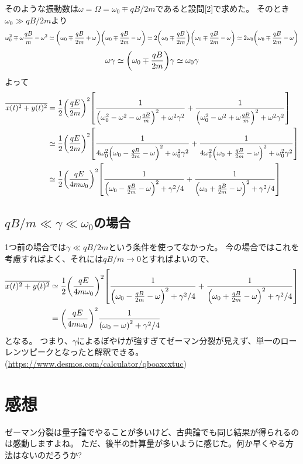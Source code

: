 \documentclass[../ap_2011.tex]{subfiles}
\begin{document}
そのような振動数は\(\omega = \Omega= \omega_0 \mp qB/2m\)であると設問[2]で求めた。
そのとき\(\omega_0\gg qB/2m\)より
\begin{equation}\begin{aligned}[b]
    \omega_0^2\mp\omega\frac{qB}{m}-\omega^2
    \simeq\qty(\omega_0\mp\frac{qB}{2m}+\omega)\qty(\omega_0\mp\frac{qB}{2m}-\omega)
    \simeq 2\qty(\omega_0\mp\frac{qB}{2m})\qty(\omega_0\mp\frac{qB}{2m}-\omega)
    \simeq 2\omega_0\qty(\omega_0\mp\frac{qB}{2m}-\omega)
\end{aligned}\end{equation}
\begin{equation}\begin{aligned}[b]
    \omega\gamma \simeq \qty(\omega_0\mp\frac{qB}{2m}) \gamma\simeq \omega_0 \gamma
\end{aligned}\end{equation}
よって
\begin{equation}\begin{aligned}[b]
    \overline{x(t)^2+y(t)^2}
    &=\frac{1}{2}\qty(\frac{qE}{2m})^2\qty[\frac{1}{\qty(\omega_0^2-\omega^2-\omega\frac{qB}{m})^2+\omega^2\gamma^2}
    +\frac{1}{\qty(\omega_0^2-\omega^2+\omega\frac{qB}{m})^2+\omega^2\gamma^2}]\\
    &\simeq\frac{1}{2}\qty(\frac{qE}{2m})^2\qty[\frac{1}{4\omega_0^2\qty(\omega_0-\frac{qB}{2m}-\omega)^2+\omega_0^2\gamma^2}
    +\frac{1}{4\omega_0^2\qty(\omega_0+\frac{qB}{2m}-\omega)^2+\omega_0^2\gamma^2}]\\
    &\simeq\frac{1}{2}\qty(\frac{qE}{4m\omega_0})^2\qty[\frac{1}{\qty(\omega_0-\frac{qB}{2m}-\omega)^2+\gamma^2/4}
    +\frac{1}{\qty(\omega_0+\frac{qB}{2m}-\omega)^2+\gamma^2/4}]
\end{aligned}\end{equation}

\subsection*{\(qB/m\ll\gamma \ll  \omega_0\)の場合}
1つ前の場合では\(\gamma\ll qB/2m\)という条件を使ってなかった。
今の場合ではこれを考慮すればよく、それには\(qB/m\to0\)とすればよいので、
\begin{equation}\begin{aligned}[b]
    \overline{x(t)^2+y(t)^2}
    &\simeq\frac{1}{2}\qty(\frac{qE}{4m\omega_0})^2\qty[\frac{1}{\qty(\omega_0-\frac{qB}{2m}-\omega)^2+\gamma^2/4}
    +\frac{1}{\qty(\omega_0+\frac{qB}{2m}-\omega)^2+\gamma^2/4}]\\
    &= \qty(\frac{qE}{4m\omega_0})^2\frac{1}{\qty(\omega_0-\omega)^2+\gamma^2/4}
\end{aligned}\end{equation}
となる。
つまり、\(\gamma\)によるぼやけが強すぎてゼーマン分裂が見えず、単一のローレンツピークとなったと解釈できる。
(\url{https://www.desmos.com/calculator/qboaxcxtuc})

\section*{感想}
ゼーマン分裂は量子論でやることが多いけど、古典論でも同じ結果が得られるのは感動しますよね。
ただ、後半の計算量が多いように感じた。何か早くやる方法はないのだろうか?
\end{document}
